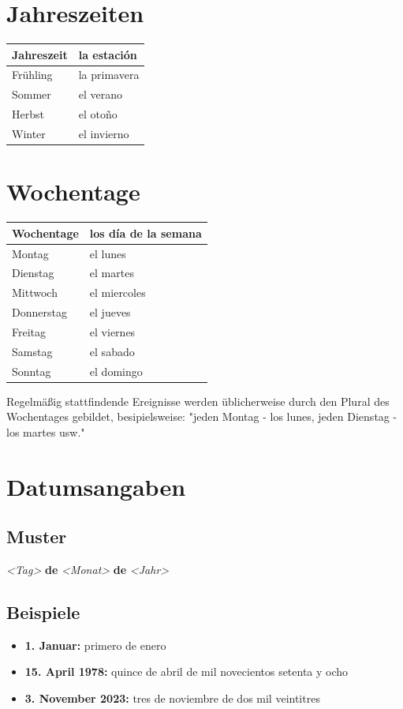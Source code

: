 \documentclass{spanish_summary}
\begin{document}
\section*{Jahreszeiten}
\begin{longtable}{p{} | p{}} 
\textbf{Jahreszeit}     & \textbf{la estación}                                       \\ \hline
\hline
\endhead %
Frühling & la primavera \\
Sommer & el verano \\
Herbst & el oto\~{n}o \\
Winter & el invierno \\
\end{longtable}

\newpage

\section*{Wochentage}
\begin{longtable}{p{} | p{}} 
\textbf{Wochentage}     & \textbf{los día de la semana}                                       \\ \hline
\hline
\endhead %
Montag & el lunes \\
Dienstag & el martes\\
Mittwoch & el miercoles \\
Donnerstag & el jueves \\
Freitag & el viernes\\
Samstag & el sabado \\
Sonntag & el domingo \\
\end{longtable}
Regelmäßig stattfindende Ereignisse werden üblicherweise durch den Plural des Wochentages gebildet, besipielsweise: "jeden Montag - los lunes, jeden Dienstag - los martes usw."

\section*{Datumsangaben}
\subsection*{Muster}
\textit{<Tag>} \textbf{de} \textit{<Monat>} \textbf{de} \textit{<Jahr> }

\subsection*{Beispiele}
\begin{itemize}
  \item \textbf{1. Januar: } primero de enero
  \item \textbf{15. April 1978: } quince de abril de mil novecientos setenta y ocho
  \item \textbf{3. November 2023: } tres de noviembre de dos mil veintitres
\end{itemize}
\end{document}
